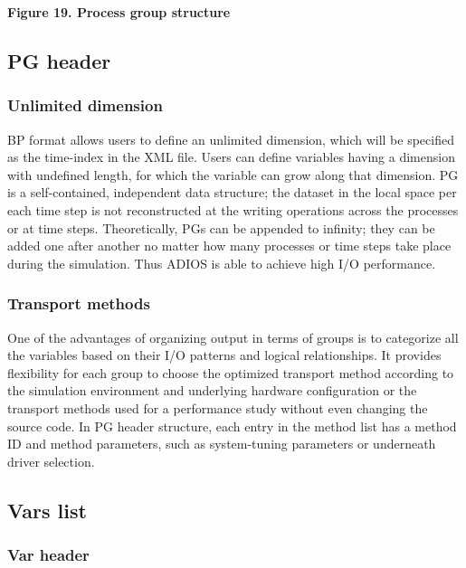 \begin{center}
{\color{color20} \textbf{Figure 19. Process group structure\label{HToc84890275}\label{HToc212016651}\label{HToc212016893}\label{HToc182553422}}}
\end{center}

\subsection{PG header}

\subsubsection{Unlimited dimension}

BP format allows users to define an unlimited dimension, which will be specified 
as the time-index in the XML file. Users can define variables having a dimension 
with undefined length, for which the variable can grow along that dimension. PG 
is a self-contained, independent data structure; the dataset in the local space 
per each time step is not reconstructed at the writing operations across the processes 
or at time steps. Theoretically, PGs can be appended to infinity; they can be added 
one after another no matter how many processes or time steps take place during 
the simulation.  Thus ADIOS is able to achieve high I/O performance.

\subsubsection{Transport methods}

One of the advantages of organizing output in terms of groups is to categorize 
all the variables based on their I/O patterns and logical relationships. It provides 
flexibility for each group to choose the optimized transport method according to 
the simulation environment and underlying hardware configuration or the transport 
methods used for a performance study without even changing the source code. In 
PG header structure, each entry in the method list has a method ID and method parameters, 
such as system-tuning parameters or underneath driver selection. 

\subsection{Vars list}

\subsubsection{Var header}

